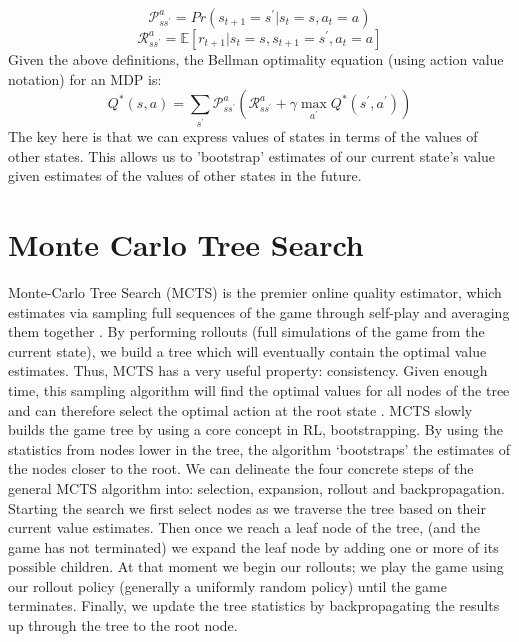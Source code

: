 \documentclass[msc, deptreport, ai, romanprepages]{infthesis}
\begin{document}
\begin{equation}
\mathcal{P}_{s{s^\prime}}^a = Pr(s_{t+1} = {s^\prime} | s_t = s, a_t = a)
\end{equation}
\begin{equation}
\mathcal{R}_{s{s^\prime}}^a = \mathbb{E}[r_{t+1} | s_t = s, s_{t+1} = {s^\prime}, a_t = a]
\end{equation}
Given the above definitions, the Bellman optimality equation (using action value notation) for an MDP is:
\begin{equation}
Q^*(s,a) = \sum_{s^\prime} \mathcal{P}_{s{s^\prime}}^a (\mathcal{R}_{s{s^\prime}}^a + \gamma \max_{a^\prime} Q^*({s^\prime}, {a^\prime}))
\end{equation}
The key here is that we can express values of states in terms of the values of other states. This allows us to 'bootstrap' estimates of our current state's value given estimates of the values of other states in the future. 

\section{Monte Carlo Tree Search}
Monte-Carlo Tree Search (MCTS) is the premier online quality estimator, which estimates via sampling full sequences of the game through self-play and averaging them together \cite{Gelly}. By performing rollouts (full simulations of the game from the current state), we build a tree which will eventually contain the optimal value estimates. Thus, MCTS has a very useful property: consistency. Given enough time, this sampling algorithm will find the optimal values for all nodes of the tree and can therefore select the optimal action at the root state \cite{Gelly}. MCTS slowly builds the game tree by using a core concept in RL, bootstrapping. By using the statistics from nodes lower in the tree, the algorithm ‘bootstraps’ the estimates of the nodes closer to the root. We can delineate the four concrete steps of the general MCTS algorithm into: selection, expansion, rollout and backpropagation. Starting the search we first select nodes as we traverse the tree based on their current value estimates. Then once we reach a leaf node of the tree, (and the game has not terminated) we expand the leaf node by adding one or more of its possible children. At that moment we begin our rollouts; we play the game using our rollout policy (generally a uniformly random policy) until the game terminates. Finally, we update the tree statistics by backpropagating the results up through the tree to the root node. 
\end{document}
